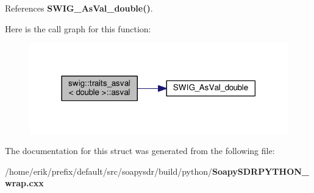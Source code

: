 References {\bf S\+W\+I\+G\+\_\+\+As\+Val\+\_\+double()}.



Here is the call graph for this function\+:
\nopagebreak
\begin{figure}[H]
\begin{center}
\leavevmode
\includegraphics[width=318pt]{d9/db9/structswig_1_1traits__asval_3_01double_01_4_aa2b3a8491625ce70a1bb03c1cc851d9a_cgraph}
\end{center}
\end{figure}




The documentation for this struct was generated from the following file\+:\begin{DoxyCompactItemize}
\item 
/home/erik/prefix/default/src/soapysdr/build/python/{\bf Soapy\+S\+D\+R\+P\+Y\+T\+H\+O\+N\+\_\+wrap.\+cxx}\end{DoxyCompactItemize}
